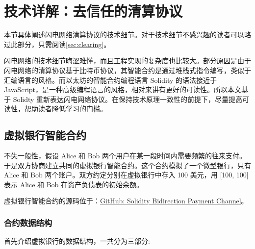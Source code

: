 \section{技术详解：去信任的清算协议}
本节具体阐述闪电网络清算协议的技术细节。对于技术细节不感兴趣的读者可以略过此部分，只需阅读\ref{sec:clearing}。

闪电网络的技术细节晦涩难懂，而且工程实现的复杂度也比较大。部分原因是由于闪电网络的清算协议基于比特币协议，其智能合约是通过堆栈式指令编写，类似于汇编语言的风格。而以太坊的智能合约编程语言 Solidity 的语法接近于 JavaScript，是一种高级编程语言的风格，相对来讲有更好的可读性。所以本文基于 Solidty 重新表达闪电网络协议。在保持技术原理一致性的前提下，尽量提高可读性，帮助读者降低学习的门槛。

\subsection{虚拟银行智能合约}

不失一般性，假设 Alice 和 Bob 两个用户在某一段时间内需要频繁的往来支付。于是双方协商建立共同的虚拟银行智能合约。这个合约模拟了一个微型银行，只有 Alice 和 Bob 两个账户。双方约定分别在虚拟银行中存入 100 美元，用 [100, 100] 表示 Alice 和 Bob 在资产负债表的初始余额。

虚拟银行智能合约的源码位于：\href{https://github.com/dapenghu/solidity-bidirection-payment-channel/blob/master/virtualBank/contracts/VirtualBank.sol}{GitHub: Solidity Bidirection Payment Channel}。

\subsubsection{合约数据结构}
首先介绍虚拟银行的数据结构，一共分为三部分:

